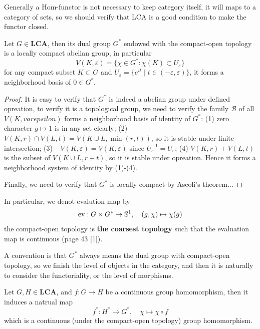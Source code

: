 Generally a Hom-functor is not necessary to keep category itself, it will maps to a category of sets, so we should verify that LCA is a good condition to make the functor closed.\\

\begin{lemma}
    Let \(G \in \mathbf{LCA}\), then its dual group \(G^*\) endowed with the compact-open topology is a locally compact abelian group, in particular
    \[V(K,\varepsilon) = \{\chi \in G^* : \chi(K) \subset U_{\varepsilon}\}\]
    for any compact subset \(K \subset G\) and \(U_{\varepsilon} = \{e^{it} \mid t \in (-\varepsilon,\varepsilon)\}\), it forms a neighborhood basis of \(0 \in G^*\).
    
\end{lemma} 

\begin{proof}
    It is easy to verify that \(G^*\) is indeed a abelian group under defined opreation, to verify it is a topological group, we need to verify the family \(\mathcal{B}\) of all \(V(K,varepsilon)\) forms a neighborhood basis of identity of \(G^*\): (1) zero character \(g \mapsto 1\) is in any set clearly; (2) \(V(K,r) \cap V(L,t) = V(K\cup L, \min(r,t))\), so it is stable under finite intersection; (3) \(-V(K,\varepsilon) = V(K,\varepsilon)\) since \(U_{\varepsilon}^{-1} = U_{\varepsilon}\); (4) \(V(K,r)+V(L,t)\) is the subset of \(V(K\cup L,r+t)\), so it is stable under opreation. Hence it forms a neighborhood system of identity by (1)-(4).

    Finally, we need to verify that \(G^*\) is locally compact by Ascoli's theorem...
\end{proof}

\begin{remark}
    In particular, we denot evalution map by
    \[\operatorname{ev}: G \times G^* \to \mathbb{S}^1, \quad (g, \chi)\mapsto \chi(g)\]
    the compact-open topology is \textbf{the coarsest topology} such that the evaluation map is continuous (page 43 [1]).
\end{remark}

A convention is that \(G^*\) always means the dual group with compact-open topology, so we finish the level of objects in the category, and then it is naturally to consider the functoriality, or the level of morphisms.

\begin{lemma}
    Let \(G,H \in \mathbf{LCA}\), and \(f: G \to H\) be a continuous group homomorphism, then it induces a natrual map
    \[f^*: H^* \to G^*, \quad \chi \mapsto \chi \circ f\]
    which is a continuous (under the compact-open topology) group homomorphism.
\end{lemma}


